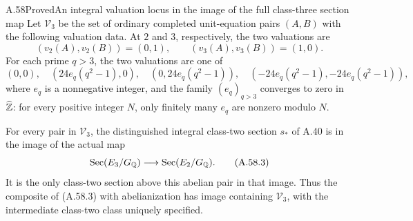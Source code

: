 \begin{statement}{A.58}{Proved}{An integral valuation locus in the image of the full class-three section map}
Let $\mathcal V_3$ be the set of ordinary completed unit-equation
pairs $(A,B)$ with the following valuation data.  At $2$ and $3$,
respectively, the two valuations are
\[
            (v_2(A),v_2(B))=(0,1),\qquad
            (v_3(A),v_3(B))=(1,0).
 \tag{A.58.1}
\]
For each prime $q>3$, the two valuations are one of
\[
 (0,0),\quad(24e_q(q^2-1),0),\quad(0,24e_q(q^2-1)),\quad
                  (-24e_q(q^2-1),-24e_q(q^2-1)),
 \tag{A.58.2}
\]
where $e_q$ is a nonnegative integer, and the family $(e_q)_{q>3}$
converges to zero in $\widehat{\mathbb Z}$: for every positive integer $N$,
only finitely many $e_q$ are nonzero modulo $N$.

For every pair in $\mathcal V_3$, the distinguished integral
class-two section $s_*$ of A.40 is in the image of the actual map
\[
             \operatorname{Sec}(E_3/G_\mathbb Q)
                   \longrightarrow\operatorname{Sec}(E_2/G_\mathbb Q).
 \tag{A.58.3}
\]
It is the only class-two section above this abelian pair in that
image.  Thus the composite of (A.58.3) with abelianization has
image containing $\mathcal V_3$, with the intermediate class-two
class uniquely specified.
\end{statement}
